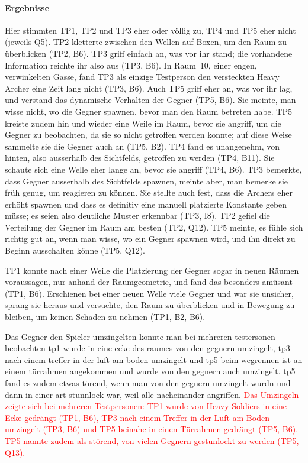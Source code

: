 \documentclass[../Main.tex]{subfiles}
\begin{document}
\paragraph{Ergebnisse}
Hier stimmten TP1, TP2 und TP3 eher oder völlig zu, TP4 und TP5 eher nicht (jeweils Q5). TP2 kletterte zwischen den Wellen auf Boxen, um den Raum zu überblicken (TP2, B6). TP3 griff einfach an, was vor ihr stand; die vorhandene Information reichte ihr also aus (TP3, B6). In Raum~10, einer engen, verwinkelten Gasse, fand TP3 als einzige Testperson den versteckten Heavy Archer eine Zeit lang nicht (TP3, B6). Auch TP5 griff eher an, was vor ihr lag, und verstand das dynamische Verhalten der Gegner (TP5, B6). Sie meinte, man wisse nicht, wo die Gegner spawnen, bevor man den Raum betreten habe. TP5 kreiste zudem hin und wieder eine Weile im Raum, bevor sie angriff, um die Gegner zu beobachten, da sie so nicht getroffen werden konnte; auf diese Weise sammelte sie die Gegner auch an (TP5, B2). TP4 fand es unangenehm, von hinten, also ausserhalb des Sichtfelds, getroffen zu werden (TP4, B11). Sie schaute sich eine Welle eher lange an, bevor sie angriff (TP4, B6).
TP3 bemerkte, dass Gegner ausserhalb des Sichtfelds spawnen, meinte aber, man bemerke sie früh genug, um reagieren zu können. Sie stellte auch fest, dass die Archers eher erhöht spawnen und dass es definitiv eine manuell platzierte Konstante geben müsse; es seien also deutliche Muster erkennbar (TP3, I8). TP2 gefiel die Verteilung der Gegner im Raum am besten (TP2, Q12). TP5 meinte, es fühle sich richtig gut an, wenn man wisse, wo ein Gegner spawnen wird, und ihn direkt zu Beginn ausschalten könne (TP5, Q12).

TP1 konnte nach einer Weile die Platzierung der Gegner sogar in neuen Räumen voraussagen, nur anhand der Raumgeometrie, und fand das besonders amüsant (TP1, B6). Erschienen bei einer neuen Welle viele Gegner und war sie unsicher, sprang sie heraus und versuchte, den Raum zu überblicken und in Bewegung zu bleiben, um keinen Schaden zu nehmen (TP1, B2, B6).

Das Gegner den Spieler umzingelten konnte man bei mehreren testersonen beobachten tp1 wurde in eine ecke des raumes von den gegnern umzingelt, tp3 nach einem treffer in der luft am boden umzingelt und tp5 beim wegrennen ist an einem türrahmen angekommen und wurde von den gegnern auch umzingelt. tp5 fand es zudem etwas törend, wenn man von den gegnern umzingelt wurdn und dann in einer art stunnlock war, weil alle nacheinander angriffen.
\textcolor{red}{Das Umzingeln zeigte sich bei mehreren Testpersonen: TP1 wurde von Heavy Soldiers in eine Ecke gedrängt (TP1, B6), TP3 nach einem Treffer in der Luft am Boden umzingelt (TP3, B6) und TP5 beinahe in einen Türrahmen gedrängt (TP5, B6). TP5 nannte zudem als störend, von vielen Gegnern gestunlockt zu werden (TP5, Q13).}
\end{document}
